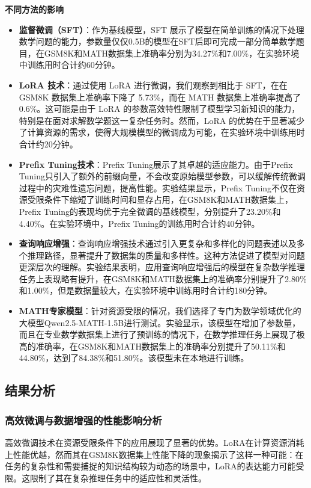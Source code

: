 \textbf{不同方法的影响}
\begin{itemize}
    \item \textbf{监督微调（SFT）}：作为基线模型，SFT 展示了模型在简单训练的情况下处理数学问题的能力，参数量仅仅0.5B的模型在SFT后即可完成一部分简单数学题目，在GSM8K和MATH数据集上准确率分别为34.27\%和7.00\%，在实验环境中训练用时合计约60分钟。
    \item \textbf{LoRA 技术}：通过使用 LoRA 进行微调，我们观察到相比于 SFT，在在 GSM8K 数据集上准确率下降了 5.73\%，而在 MATH 数据集上准确率提高了 0.6\%。这可能是由于 LoRA 的参数高效特性限制了模型学习新知识的能力，特别是在面对求解数学题这一复杂任务时。然而，LoRA 的优势在于显著减少了计算资源的需求，使得大规模模型的微调成为可能，在实验环境中训练用时合计约20分钟。
    \item \textbf{Prefix Tuning技术}：Prefix Tuning展示了其卓越的适应能力。由于Prefix Tuning只引入了额外的前缀向量，不会改变原始模型参数，可以缓解传统微调过程中的灾难性遗忘问题，提高性能。实验结果显示，Prefix Tuning不仅在资源受限条件下缩短了训练时间和显存占用，在GSM8K和MATH数据集上，Prefix Tuning的表现均优于完全微调的基线模型，分别提升了23.20\%和4.40\%。在实验环境中，Prefix Tuning的训练用时合计约40分钟。
    \item \textbf{查询响应增强}：查询响应增强技术通过引入更复杂和多样化的问题表述以及多个推理路径，显著提升了数据集的质量和多样性。这种方法促进了模型对问题更深层次的理解。实验结果表明，应用查询响应增强后的模型在复杂数学推理任务上表现略有提升，在GSM8K和MATH数据集上的准确率分别提升了2.80\%和1.00\%，但是数据量较大，在实验环境中训练用时合计约180分钟。
    \item \textbf{MATH专家模型}：针对资源受限的情况，我们选择了专门为数学领域优化的大模型Qwen2.5-MATH-1.5B进行测试。实验显示，该模型在增加了参数量，而且在专业数学数据集上进行了预训练的情况下，在数学推理任务上展现了极高的准确率，在GSM8K和MATH数据集上的准确率分别提升了50.11\%和44.80\%，达到了84.38\%和51.80\%。该模型未在本地进行训练。
\end{itemize}

\subsection{结果分析} 
\subsubsection{高效微调与数据增强的性能影响分析}

高效微调技术在资源受限条件下的应用展现了显著的优势。LoRA在计算资源消耗上性能优越，然而其在GSM8K数据集上性能下降的现象揭示了这样一种可能：在任务的复杂性和需要捕捉的知识结构较为动态的场景中，LoRA的表达能力可能受限。这限制了其在复杂推理任务中的适应性和灵活性。


